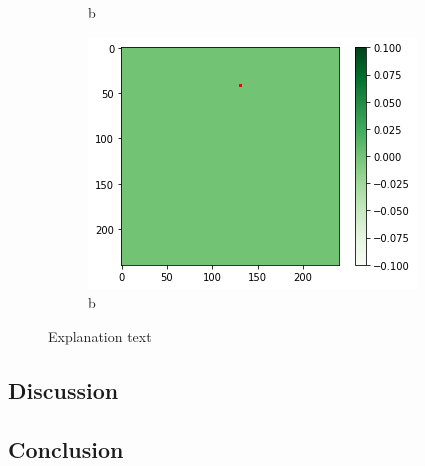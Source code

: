 \begin{figure}[H]
\begin{subfigure}{.33\textwidth}
        \caption{b}
    \end{subfigure}
        \begin{subfigure}{.33\textwidth}
        \centering
        \includegraphics[width=\linewidth]{chapters/04_segmentation/images/grad_cam_36.png}
        \caption{b}
    \end{subfigure}
    \caption{Explanation text}
\end{figure}

\subsection{Discussion}

\subsection{Conclusion}
